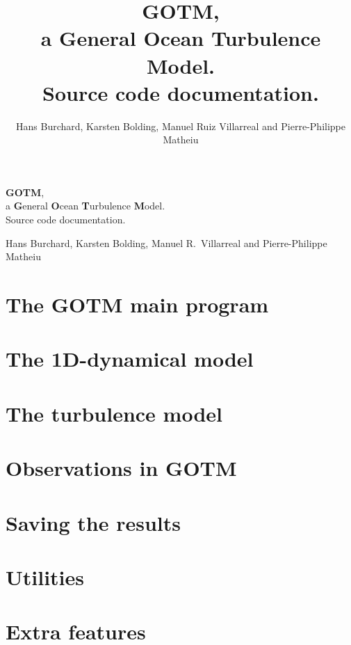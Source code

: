 \documentclass[letter,fleqn]{article}
\title{{\bf GOTM}, \\ a {\bf G}eneral {\bf O}cean {\bf T}urbulence
{\bf M}odel. \\ Source code documentation.}
\author{\sc Hans Burchard, Karsten Bolding, Manuel Ruiz Villarreal and Pierre-Philippe Matheiu}
\begin{document}
\thispagestyle{empty}

{\LARGE
\begin{center}
{\bf GOTM}, 
\\ a {\bf G}eneral {\bf O}cean {\bf T}urbulence {\bf M}odel. 
\\ Source code documentation.
\end{center}
}

{\large
\begin{center}
{\sc Hans Burchard, Karsten Bolding, Manuel R.\ Villarreal and Pierre-Philippe Matheiu}
\end{center}
}

\newpage
\tableofcontents
\newpage



\section{The GOTM main program}


\section{The 1D-dynamical model}


\section{The turbulence model}


\section{Observations in GOTM}


\section{Saving the results}


\section{Utilities}


\section{Extra features}

\end{document}
